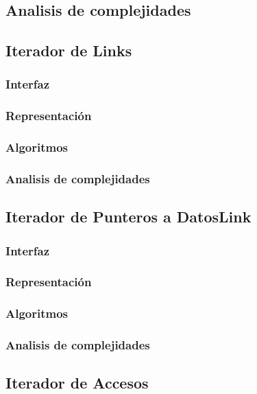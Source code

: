 \documentclass[12pt, a4paper]{article}
\begin{document}
\subsection{Analisis de complejidades}


\subsection{Iterador de Links} 
\subsubsection{Interfaz}

\subsubsection{Representaci\'on}

\subsubsection{Algoritmos}

\subsubsection{Analisis de complejidades}

 
\subsection{Iterador de Punteros a DatosLink} 
\subsubsection{Interfaz}

\subsubsection{Representaci\'on}

\subsubsection{Algoritmos}

\subsubsection{Analisis de complejidades}

 
\subsection{Iterador de Accesos} 
\end{document}
